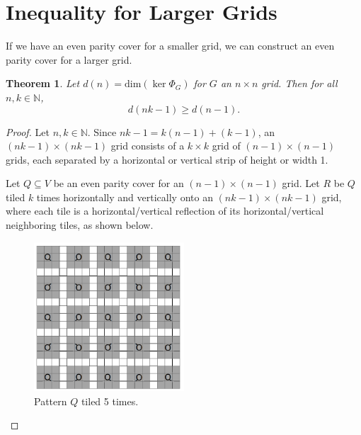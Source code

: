 \documentclass[a4paper]{article}
\newtheorem{theorem}{Theorem}
\newcommand{\N}{\mathbb{N}}
\renewcommand{\dim}[1]{\text{dim}\left( #1 \right)}
\begin{document}
	\section{Inequality for Larger Grids}
	If we have an even parity cover for a smaller grid, we can construct an even parity cover for a larger grid.
	
	\begin{theorem}\label{tiling-quiet-patterns}
		Let $d(n) = \dim{\ker{\Phi_G}}$ for $G$ an $n \times n$ grid.
		Then for all $n,k \in \N$,
		\begin{equation*}
			d(nk - 1) \geq d(n-1).
		\end{equation*}
	\end{theorem}
	\begin{proof}
		Let $n,k \in \N$.
		Since $nk - 1 = k(n-1) + (k-1)$, an $(nk-1) \times (nk-1)$ grid consists of a $k \times k$ grid of $(n-1) \times (n-1)$ grids, each separated by a horizontal or vertical strip of height or width 1.
	
		Let $Q \subseteq V$ be an even parity cover for an $(n-1) \times (n-1)$ grid.
		Let $R$ be $Q$ tiled $k$ times horizontally and vertically onto an $(nk-1) \times (nk-1)$ grid, where each tile is a horizontal/vertical reflection of its horizontal/vertical neighboring tiles, as shown below.
		
		\begin{figure}[H]
			\centering
%				
%				
%						
			\includegraphics[width=0.5\textwidth]{tiling_q.png}
			\caption{Pattern $Q$ tiled 5 times.}	
		\end{figure}
	

\end{proof}
\end{document}
